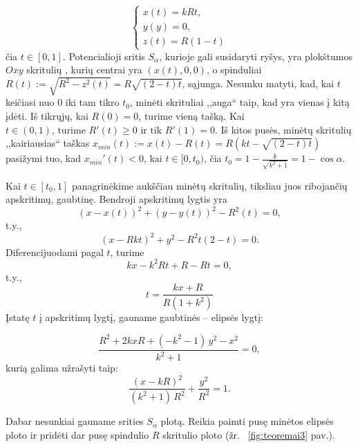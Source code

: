 \documentclass[10pt]{article}
\begin{document}
\[
\begin{cases}
x(t) = kRt, \\
y(y) = 0, \\
z(t) = R(1-t)
\end{cases}
\]
čia $ t \in [0,1] $. Potencialioji sritis $ S_{\alpha} $, kurioje gali susidaryti ryšys, yra plokštumos $ Oxy $ skritulių , kurių centrai yra $ (x(t),0,0)$, o spinduliai $ R(t):=\sqrt{R^2-z^2(t)}=R\sqrt{(2-t)t} $, sąjunga.
Nesunku matyti, kad, kai $ t $ keičiasi nuo $ 0 $ iki tam tikro $ t_0 $, minėti skrituliai ,,auga`` taip, kad yra vienas į kitą įdėti. 
Iš tikrųjų, kai $ R(0)=0 $,  turime vieną tašką. Kai $ t \in \left( 0,1 \right)\mbox{, turime } R'(t) \geq 0 \mbox{ ir tik } R'(1)=0 $. Iš kitos pusės, minėtų skritulių ,,kairiausias`` taškas $ x_{min}(t) := x(t) - R(t) = R(kt-\sqrt{(2-t)t}) $ pasižymi tuo, kad $ x_{min}'(t) < 0 $, kai $ t \in [0, t_{0}) $, čia 
$ t_{0} = 1 - \frac{k}{\sqrt{k^2+1}} = 1 - \cos \alpha  $.

Kai $ t \in [t_{0}, 1] $ panagrinėkime aukščiau minėtų skritulių, tiksliau juos ribojančių apskritimų, gaubtinę. Bendroji apskritimų lygtis yra
$$ (x-x(t))^2 + (y-y(t))^2 - R^2(t) = 0, $$ 
t.y.,
$$ (x-Rkt)^2 + y^2 - R^2t(2-t) = 0 . $$ 
Diferencijuodami pagal $ t $, turime 
$$ kx-k^2Rt+R-Rt = 0,  $$
t.y.,
$$
	t=\frac{kx+R}{R(1+k^2)}
$$
Įstatę $ t $ į apskritimų lygtį, gauname  gaubtinės -- elipsės lygtį:

\[\frac{{R}^{2}+2kxR+\left( -{k}^{2}-1\right) \,{y}^{2}-{x}^{2}}{{k}^{2}+1}=0, \]
kurią galima užrašyti taip:
\[\frac{{\left( x-kR\right) }^{2}}{\left( {k}^{2}+1\right) \,{R}^{2}}+\frac{{y}^{2}}{{R}^{2}}=1.\]


Dabar nesunkiai gauname srities $ S_{\alpha} $ plotą. Reikia paimti pusę minėtos elipsės ploto ir pridėti dar  pusę spindulio $ R $ skritulio ploto (žr. ~\ref{fig:teoremai3} pav.). 
\end{document}
